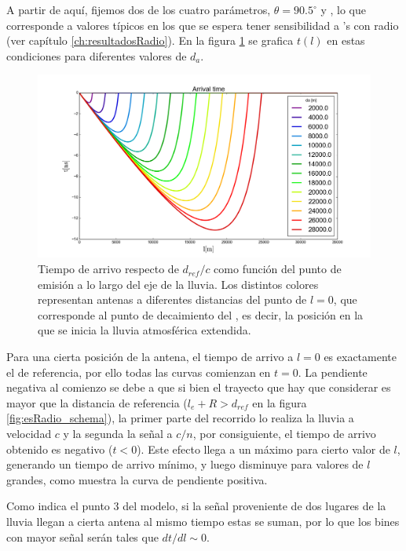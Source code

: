 	A partir de aquí, fijemos dos de los cuatro parámetros, $\theta=90.5^\circ$ y , lo que corresponde a valores t\'ipicos en los que se espera tener sensibilidad a \nutau{}'s con radio (ver cap\'itulo \ref{ch:resultadosRadio}).
	En la figura \ref{fig:timeDelay_at} se grafica $t(l)$ en estas condiciones para diferentes valores de $d_a$.
	\begin{figure}[ht!]
		\centering
		\includegraphics[width=\textwidth]{./fig/EASRadio/timeDelay_at}
		\caption{\label{fig:timeDelay_at}
		Tiempo de arrivo respecto de $d_{ref}/c$ como funci\'on del punto de emisi\'on a lo largo del eje de la lluvia. Los distintos colores representan antenas a diferentes distancias del punto de $l=0$, que corresponde al punto de decaimiento del \tauon{}, es decir, la posici\'on en la que se inicia la lluvia atmosf\'erica extendida.
		}
	\end{figure}
	Para una cierta posición de la antena, el tiempo de arrivo a $l=0$ es exactamente el de referencia, por ello todas las curvas comienzan en $t = 0$.
	La pendiente negativa al comienzo se debe a que si bien el trayecto que hay que considerar es mayor que la distancia de referencia ($l_e+R>d_{ref}$ en la figura \ref{fig:esRadio_schema}), la primer parte del recorrido lo realiza la lluvia a velocidad $c$ y la segunda la señal a $c/n$,  por consiguiente, el tiempo de arrivo obtenido es negativo ($t<0$).
	Este efecto llega a un máximo para cierto valor de $l$, generando un tiempo de arrivo mínimo, y luego disminuye para valores de $l$ grandes, como muestra la curva de pendiente positiva.
	
	Como indica el punto 3 del modelo, si la señal proveniente de dos lugares de la lluvia llegan a cierta antena al mismo tiempo estas se suman, por lo que los bines con mayor señal serán tales que $dt/dl\sim0$.
	
